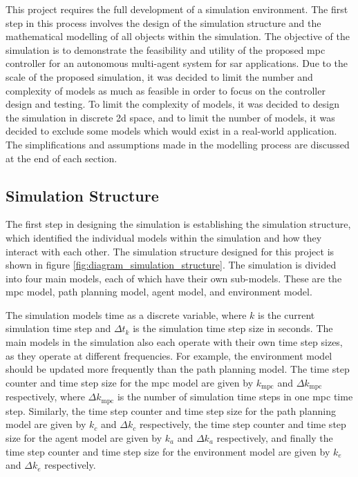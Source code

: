 \documentclass[conference]{IEEEtran}
\begin{document}
This project requires the full development of a simulation environment.
The first step in this process involves the design of the simulation structure and the mathematical modelling of all objects within the simulation.
The objective of the simulation is to demonstrate the feasibility and utility of the proposed \gls{mpc} controller for an autonomous multi-agent system for \gls{sar} applications.
Due to the scale of the proposed simulation, it was decided to limit the number and complexity of models as much as feasible in order to focus on the controller design and testing.
To limit the complexity of models, it was decided to design the simulation in discrete \gls{2d} space, and to limit the number of models, it was decided to exclude some models which would exist in a real-world application.
The simplifications and assumptions made in the modelling process are discussed at the end of each section.

\subsection{Simulation Structure} \label{subsec:simulationStructure}

The first step in designing the simulation is establishing the simulation structure, which identified the individual models within the simulation and how they interact with each other.
The simulation structure designed for this project is shown in figure \ref{fig:diagram_simulation_structure}.
The simulation is divided into four main models, each of which have their own sub-models.
These are the \gls{mpc} model, path planning model, agent model, and environment model.

\begin{figure*}
    \centering
    
    \caption{Block Diagram of Simulation Structure}
    \label{fig:diagram_simulation_structure}
\end{figure*}

The simulation models time as a discrete variable, where $k$ is the current simulation time step and $\Delta t_{k}$ is the simulation time step size in seconds.
The main models in the simulation also each operate with their own time step sizes, as they operate at different frequencies.
For example, the environment model should be updated more frequently than the path planning model.
The time step counter and time step size for the \gls{mpc} model are given by $k_{\text{mpc}}$ and $\Delta k_{\text{mpc}}$ respectively, where $\Delta k_{\text{mpc}}$ is the number of simulation time steps in one \gls{mpc} time step.
Similarly, the time step counter and time step size for the path planning model are given by $k_{c}$ and $\Delta k_{c}$ respectively, the time step counter and time step size for the agent model are given by $k_{a}$ and $\Delta k_{a}$ respectively, and finally the time step counter and time step size for the environment model are given by $k_{e}$ and $\Delta k_{e}$ respectively.
\end{document}
